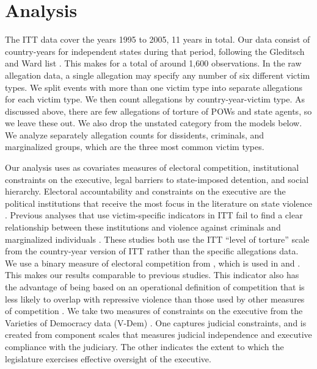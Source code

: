 \documentclass[11pt]{article}
\begin{document}
\section*{Analysis}

The ITT data cover the years 1995 to 2005, 11 years in total. Our data consist of country-years for independent states during that period, following the Gleditsch and Ward list \citep{gleditsch:ward:1999}. This makes for a total of around 1,600 observations. In the raw allegation data, a single allegation may specify any number of six different victim types. We split events with more than one victim type into separate allegations for each victim type. We then count allegations by country-year-victim type. As discussed above, there are few allegations of torture of POWs and state agents, so we leave these out. We also drop the unstated category from the models below. We analyze separately allegation counts for dissidents, criminals, and marginalized groups, which are the three most common victim types. 

Our analysis uses as covariates measures of electoral competition, institutional constraints on the executive, legal barriers to state-imposed detention, and social hierarchy. Electoral accountability and constraints on the executive are the political institutions that receive the most focus in the literature on state violence \citep[e.g.,][]{Davenport2007}. Previous analyses that use victim-specific indicators in ITT fail to find a clear relationship between these institutions and violence against criminals and marginalized individuals \citep{Haschke2018,JacksonHillHall2018}. These studies both use the ITT ``level of torture'' scale from the country-year version of ITT \citep{conrad2013disaggregating} rather than the specific allegations data. We use a binary measure of electoral competition from \citet{cheibub2010democracy}, which is used in \citet{Haschke2018} and \citet{JacksonHillHall2018}. This makes our results comparable to previous studies. This indicator also has the advantage of being based on an operational definition of competition that is less likely to overlap with repressive violence than those used by other measures of competition \citep[See][]{Hill2016}. We take two measures of constraints on the executive from the Varieties of Democracy data (V-Dem) \citep{Vdem}. One captures judicial constraints, and is created from component scales that measures judicial independence and executive compliance with the judiciary. The other indicates the extent to which the legislature exercises effective oversight of the executive. 
\end{document}

